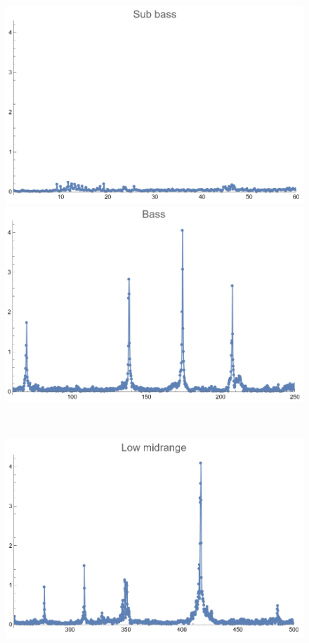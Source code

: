 \documentclass[12pt, letterpaper]{article}
\begin{document}
\begin{figure}[H]
  \centering
  \begin{minipage}{.3\textwidth}
    \centering
    \includegraphics[width=.9\linewidth]{imgs/Cancion10/subbass.png}
  \end{minipage}
  \begin{minipage}{0.03\textwidth}\end{minipage}
  \begin{minipage}{.3\textwidth}
    \centering
    \includegraphics[width=.9\linewidth]{imgs/Cancion10/bass.png}
  \end{minipage} \medskip \\
  \begin{minipage}{.3\textwidth}
    \centering
    \includegraphics[width=.9\linewidth]{imgs/Cancion10/lowmid.png}

\end{minipage}
\end{figure}
\end{document}
